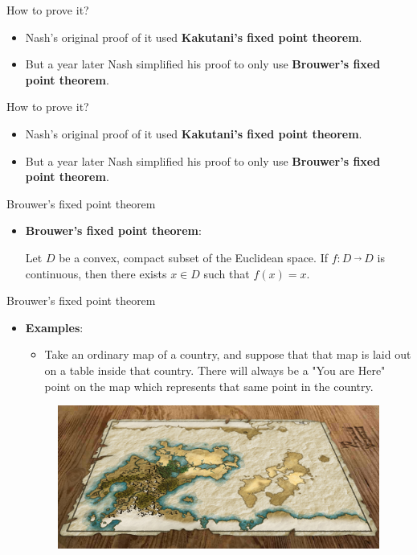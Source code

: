 \documentclass{beamer}
\begin{document}
\begin{frame}[fragile]{How to prove it?}
\begin{itemize}[<+->]
	\item Nash's original proof of it used \textbf{Kakutani's fixed point theorem}.
	\item But a year later Nash simplified his proof to only use \textbf{Brouwer’s fixed point theorem}.
\end{itemize}
\end{frame}

\begin{frame}[fragile]{How to prove it?}
	\begin{itemize}
		\item Nash's original proof of it used \textbf{Kakutani's fixed point theorem}.
		\item But a year later Nash simplified his proof to only use \textbf{\color{red}\large Brouwer’s fixed point theorem}.
	\end{itemize}
\end{frame}

\begin{frame}[fragile]{Brouwer’s fixed point theorem}
	\begin{itemize}
		\item \textbf{\large Brouwer’s fixed point theorem}:
		
		\qquad Let $D$ be a convex, compact subset of the Euclidean space. If $f : D\  \overrightarrow{}\ D$ is
		continuous, then there exists $x \in D$ such that $f (x) = x$.
	\end{itemize}
\end{frame}

\begin{frame}[fragile]{Brouwer’s fixed point theorem}
	\begin{itemize}
		\item \textbf{Examples}:
		\begin{itemize}
			\item Take an ordinary map of a country, and suppose that that map is laid out on a table inside that country. There will always be a "You are Here" point on the map which represents that same point in the country.
		\end{itemize}
		\begin{figure}[H]
			\centering
			\includegraphics[width=0.7\linewidth]{001.jpg}\vspace{-10pt}
			\nonumber\vspace{-10pt}
		\end{figure}
	\end{itemize}
\end{frame}
\end{document}
